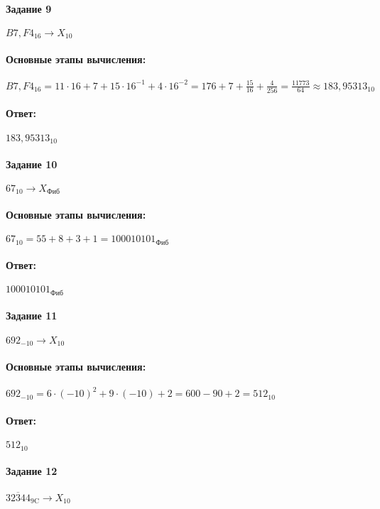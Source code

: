 \paragraph{Задание 9}
$B7,F4_{16} \rightarrow X_{10}$

\paragraph{Основные этапы вычисления:}
\hfill \break
$B7,F4_{16} = 11\cdot16+7+15\cdot16^{-1}+4\cdot16^{-2} = 176+7+\frac{15}{16}+\frac{4}{256} =\frac{11773}{64} \approx 183,95313_{10}$
\paragraph{Ответ:}
$183,95313_{10}$

\paragraph{Задание 10}
$67_{10} \rightarrow X_\text{Фиб}$

\paragraph{Основные этапы вычисления:}
\hfill \break

$67_{10} = 55 + 8 + 3 + 1 = 100010101_\text{Фиб}$

\paragraph{Ответ:}
$100010101_\text{Фиб}$

\paragraph{Задание 11}
$692_{-10} \rightarrow X_{10}$

\paragraph{Основные этапы вычисления:}
\hfill \break

$692_{-10} = 6\cdot(-10)^{2}+9\cdot(-10)+2 = 600 - 90 + 2 = 512_{10}$

\paragraph{Ответ:}
$512_{10}$

\paragraph{Задание 12}
$32\overline{3}44_\text{9C} \rightarrow X_{10}$

